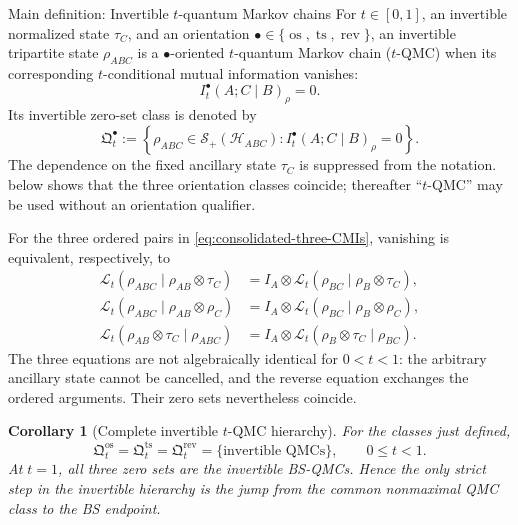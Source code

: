 \documentclass[11pt]{article}
\newtheorem{corollary}[corollary]{Corollary}
\theoremstyle{remark}
\DeclareMathOperator{\os}{os}
\DeclareMathOperator{\ts}{ts}
\DeclareMathOperator{\rev}{rev}
\newcommand{\1}{\mathbbm{1}}
\begin{document}
\begin{mainobject}{Main definition: Invertible $t$-quantum Markov chains}
For $t\in[0,1]$, an invertible normalized state $\tau_C$, and an
orientation $\bullet\in\{\os,\ts,\rev\}$, an invertible tripartite
state $\rho_{ABC}$ is a $\bullet$-oriented $t$-quantum Markov chain
($t$-QMC) when its corresponding $t$-conditional mutual information
vanishes:
\begin{equation}
 I_t^\bullet(A;C\mid B)_\rho=0.
 \label{eq:consolidated-tqmc-definition}
\end{equation}
Its invertible zero-set class is denoted by
\begin{equation}
 \mathfrak Q_t^\bullet
 :=\left\{\rho_{ABC}\in
 \mathcal S_{+}(\mathcal H_{ABC}):
 I_t^\bullet(A;C\mid B)_\rho=0\right\}.
 \label{eq:consolidated-tqmc-zero-set-definition}
\end{equation}
The dependence on the fixed ancillary state $\tau_C$ is suppressed
from the notation.  
below shows that the three orientation classes coincide; thereafter
``$t$-QMC'' may be used without an orientation qualifier.
\end{mainobject}

For the three ordered pairs in
\eqref{eq:consolidated-three-CMIs}, vanishing is equivalent,
respectively, to
\begin{align}
 \mathcal L_t(\rho_{ABC}\mid\rho_{AB}\otimes\tau_C)
 &=I_A\otimes
 \mathcal L_t(\rho_{BC}\mid\rho_B\otimes\tau_C),
 \label{eq:consolidated-os-recovery}\\
 \mathcal L_t(\rho_{ABC}\mid\rho_{AB}\otimes\rho_C)
 &=I_A\otimes
 \mathcal L_t(\rho_{BC}\mid\rho_B\otimes\rho_C),
 \label{eq:consolidated-ts-recovery}\\
 \mathcal L_t(\rho_{AB}\otimes\tau_C\mid\rho_{ABC})
 &=I_A\otimes
 \mathcal L_t(\rho_B\otimes\tau_C\mid\rho_{BC}).
 \label{eq:consolidated-rev-recovery}
\end{align}
The three equations are not algebraically identical for
$0<t<1$: the arbitrary ancillary state cannot be cancelled, and
the reverse equation exchanges the ordered arguments.  Their zero
sets nevertheless coincide.

\begin{corollary}[Complete invertible $t$-QMC hierarchy]
\label{cor:consolidated-tQMC-hierarchy}
For the classes just defined,
\begin{equation}
 \mathfrak Q_t^{\os}
 =\mathfrak Q_t^{\ts}
 =\mathfrak Q_t^{\rev}
 =\{\text{invertible QMCs}\},
 \qquad 0\leq t<1.
 \label{eq:consolidated-three-zero-sets}
\end{equation}
At $t=1$, all three zero sets are the invertible BS-QMCs.  Hence the
only strict step in the invertible hierarchy is the jump from the
common nonmaximal QMC class to the BS endpoint.
\end{corollary}
\end{document}
